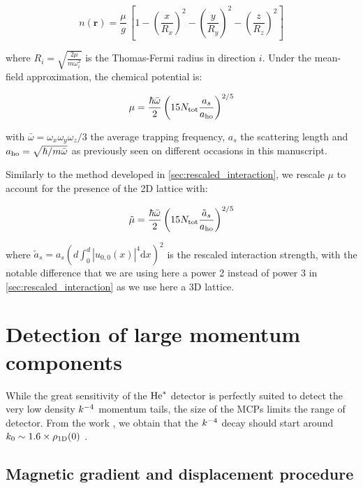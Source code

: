 \begin{equation}
     n(\bm{r}) = \frac{\mu}{g} \, \left[ 1 - \left( \frac{x}{R_x} \right)^2 - \left( \frac{y}{R_y} \right)^2 - \left( \frac{z}{R_z} \right)^2 \right]
\end{equation}

\noindent where $R_i = \sqrt{\frac{2 \mu}{m \omega_i^2}}$ is the Thomas-Fermi radius in direction $i$. Under the mean-field approximation, the chemical potential is:

\begin{equation}
     \mu = \frac{\hbar \bar{\omega}}{2} \left(  15 N_{\rm{tot}} \frac{a_s}{a_{\rm{ho}}}\right)^{2/5}
\end{equation}

with $\bar{\omega}=\omega_x \omega_y \omega_z/3$ the average trapping frequency, $a_s$ the scattering length and $a_{\rm{ho}}=\sqrt{\hbar/m \bar{\omega}}$ as previously seen on different occasions in this manuscript.

Similarly to the method developed in \ref{sec:rescaled_interaction}, we rescale $\mu$ to account for the presence of the 2D lattice with:

\begin{equation}
    \tilde{\mu} = \frac{\hbar \bar{\omega}}{2} \left(  15 N_{\rm{tot}} \frac{\tilde{a}_s}{a_{\rm{ho}}}\right)^{2/5}
\end{equation}

\noindent where $\tilde{a}_s= a_s \left(d \int_0^d |u_{0,0} (x)|^4 \mathrm{d}x \right)^2$ is the rescaled interaction strength, with the notable difference that we are using here a power 2 instead of power 3 in \ref{sec:rescaled_interaction} as we use here a 3D lattice. 


\section{Detection of large momentum components}

While the great sensitivity of the $\mathrm{He}^*$ detector is perfectly suited to detect the very low density $k^{-4}$ momentum tails, the size of the MCPs limits the range of detector. From the work \cite{xu2015universal}, we obtain that the $k^{-4}$ decay should start around $k_0 \sim 1.6 \times \rho_{\rm{1D}}(0)$ .

\subsection{Magnetic gradient and displacement procedure}

